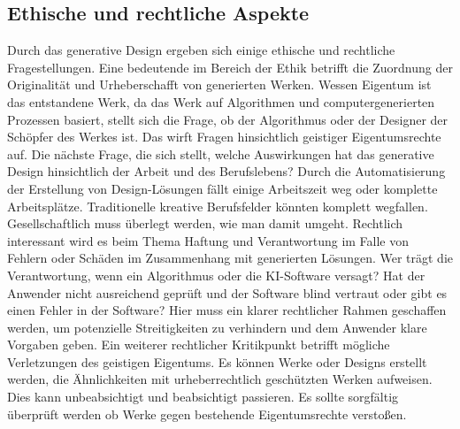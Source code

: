 \subsection*{Ethische und rechtliche Aspekte}
Durch das generative Design ergeben sich einige ethische und rechtliche Fragestellungen. Eine bedeutende im Bereich der Ethik betrifft die Zuordnung der Originalität und Urheberschafft von generierten Werken. Wessen Eigentum ist das entstandene Werk, da das Werk auf Algorithmen und computergenerierten Prozessen basiert, stellt sich die Frage, ob der Algorithmus oder der Designer der Schöpfer des Werkes ist. Das wirft Fragen hinsichtlich geistiger Eigentumsrechte auf. 
Die nächste Frage, die sich stellt, welche Auswirkungen hat das generative Design hinsichtlich der Arbeit und des Berufslebens? Durch die Automatisierung der Erstellung von Design-Lösungen fällt einige Arbeitszeit weg oder komplette Arbeitsplätze. Traditionelle kreative Berufsfelder könnten komplett wegfallen. Gesellschaftlich muss überlegt werden, wie man damit umgeht. 
Rechtlich interessant wird es beim Thema Haftung und Verantwortung im Falle von Fehlern oder Schäden im Zusammenhang mit generierten Lösungen. Wer trägt die Verantwortung, wenn ein Algorithmus oder die KI-Software versagt? Hat der Anwender nicht ausreichend geprüft und der Software blind vertraut oder gibt es einen Fehler in der Software? Hier muss ein klarer rechtlicher Rahmen geschaffen werden, um potenzielle Streitigkeiten zu verhindern und dem Anwender klare Vorgaben geben. 
Ein weiterer rechtlicher Kritikpunkt betrifft mögliche Verletzungen des geistigen Eigentums. Es können Werke oder Designs erstellt werden, die Ähnlichkeiten mit urheberrechtlich geschützten Werken aufweisen. Dies kann unbeabsichtigt und beabsichtigt passieren. Es sollte sorgfältig überprüft werden ob Werke gegen bestehende Eigentumsrechte verstoßen. \autocite{6}
